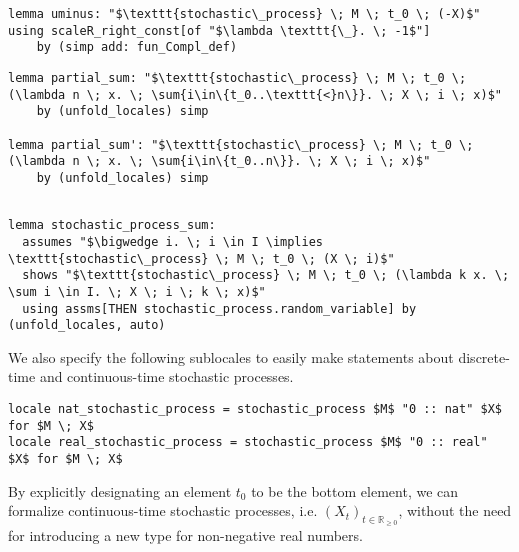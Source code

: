 \begin{isalemma}
{\small
\begin{lstlisting}[style=isabelle]
lemma uminus: "$\texttt{stochastic\_process} \; M \; t_0 \; (-X)$" using scaleR_right_const[of "$\lambda \texttt{\_}. \; -1$"] 
	by (simp add: fun_Compl_def)
\end{lstlisting}
}
\end{isalemma}

\begin{isalemma}
{\small
\begin{lstlisting}[style=isabelle]
lemma partial_sum: "$\texttt{stochastic\_process} \; M \; t_0 \; (\lambda n \; x. \; \sum{i\in\{t_0..\texttt{<}n\}}. \; X \; i \; x)$" 
	by (unfold_locales) simp

lemma partial_sum': "$\texttt{stochastic\_process} \; M \; t_0 \; (\lambda n \; x. \; \sum{i\in\{t_0..n\}}. \; X \; i \; x)$" 
	by (unfold_locales) simp
\end{lstlisting}
}
\end{isalemma}

\begin{isalemma}
{\small
\begin{lstlisting}[style=isabelle]

lemma stochastic_process_sum:
  assumes "$\bigwedge i. \; i \in I \implies \texttt{stochastic\_process} \; M \; t_0 \; (X \; i)$"
  shows "$\texttt{stochastic\_process} \; M \; t_0 \; (\lambda k x. \; \sum i \in I. \; X \; i \; k \; x)$" 
  using assms[THEN stochastic_process.random_variable] by (unfold_locales, auto)

\end{lstlisting}
}
\end{isalemma}

We also specify the following sublocales to easily make statements about discrete-time and continuous-time stochastic processes.

\begin{isadefinition}
{\small
\begin{lstlisting}[style=isabelle]
locale nat_stochastic_process = stochastic_process $M$ "0 :: nat" $X$ for $M \; X$
locale real_stochastic_process = stochastic_process $M$ "0 :: real" $X$ for $M \; X$
\end{lstlisting}
}
\end{isadefinition}

By explicitly designating an element $t_0$ to be the bottom element, we can formalize continuous-time stochastic processes, i.e. $(X_t)_{t \in \mathbb{R}_{\ge 0}}$, without the need for introducing a new type for non-negative real numbers. 

